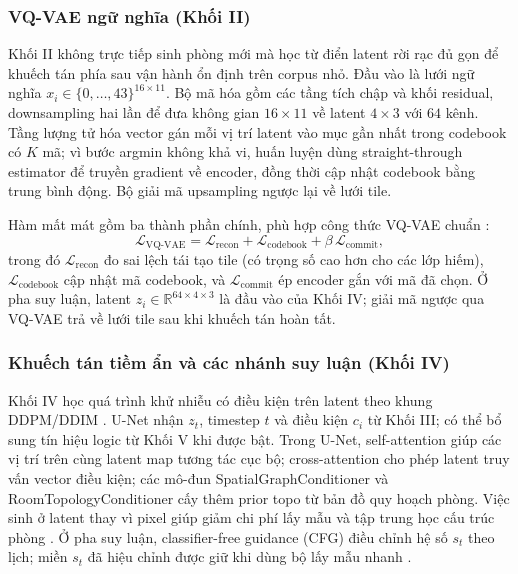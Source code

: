 \documentclass[oneside,a4paper,12pt]{extreport}
\begin{document}
\subsubsection{VQ-VAE ngữ nghĩa (Khối II)}
Khối II không trực tiếp sinh phòng mới mà học từ điển latent rời rạc đủ gọn để khuếch tán phía sau vận hành ổn định trên corpus nhỏ. Đầu vào là lưới ngữ nghĩa $x_i \in \{0,\ldots,43\}^{16\times 11}$. Bộ mã hóa gồm các tầng tích chập và khối residual, downsampling hai lần để đưa không gian $16\times 11$ về latent $4\times 3$ với $64$ kênh. Tầng lượng tử hóa vector gán mỗi vị trí latent vào mục gần nhất trong codebook có $K$ mã; vì bước argmin không khả vi, huấn luyện dùng straight-through estimator để truyền gradient về encoder, đồng thời cập nhật codebook bằng trung bình động. Bộ giải mã upsampling ngược lại về lưới tile.

Hàm mất mát gồm ba thành phần chính, phù hợp công thức VQ-VAE chuẩn \cite{oord2017vqvae}:
\begin{equation}
\mathcal{L}_{\mathrm{VQ\text{-}VAE}} =
\mathcal{L}_{\mathrm{recon}} +
\mathcal{L}_{\mathrm{codebook}} +
\beta\,\mathcal{L}_{\mathrm{commit}},
\end{equation}
trong đó $\mathcal{L}_{\mathrm{recon}}$ đo sai lệch tái tạo tile (có trọng số cao hơn cho các lớp hiếm), $\mathcal{L}_{\mathrm{codebook}}$ cập nhật mã codebook, và $\mathcal{L}_{\mathrm{commit}}$ ép encoder gắn với mã đã chọn. Ở pha suy luận, latent $z_i \in \mathbb{R}^{64\times 4\times 3}$ là đầu vào của Khối IV; giải mã ngược qua VQ-VAE trả về lưới tile sau khi khuếch tán hoàn tất.

\subsubsection{Khuếch tán tiềm ẩn và các nhánh suy luận (Khối IV)}
Khối IV học quá trình khử nhiễu có điều kiện trên latent theo khung DDPM/DDIM \cite{ho2020ddpm,song2021ddim}. U-Net nhận $z_t$, timestep $t$ và điều kiện $c_i$ từ Khối III; có thể bổ sung tín hiệu logic từ Khối V khi được bật. Trong U-Net, self-attention giúp các vị trí trên cùng latent map tương tác cục bộ; cross-attention cho phép latent truy vấn vector điều kiện; các mô-đun SpatialGraphConditioner và RoomTopologyConditioner cấy thêm prior topo từ bản đồ quy hoạch phòng. Việc sinh ở latent thay vì pixel giúp giảm chi phí lấy mẫu và tập trung học cấu trúc phòng \cite{rombach2022ldm}. Ở pha suy luận, classifier-free guidance (CFG) điều chỉnh hệ số $s_t$ theo lịch; miền $s_t$ đã hiệu chỉnh được giữ khi dùng bộ lấy mẫu nhanh \cite{ho2022cfg}.
\end{document}
